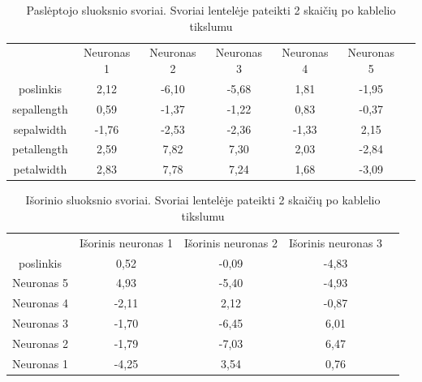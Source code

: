 \documentclass{VUMIFPSbakalaurinis}
\begin{document}
\begin{table}[]
  \centering
  \caption{Paslėptojo sluoksnio svoriai. Svoriai 
    lentelėje pateikti 2 skaičių po kablelio tikslumu}{
      \begin{tabular}{|c|c|c|c|c|c|c}
        \cline{1-6}
                    & Neuronas 1 & Neuronas 2 & Neuronas 3 & Neuronas 4 & Neuronas 5 &  \\ \cline{1-6}
        poslinkis   & 2,12       & -6,10      & -5,68      & 1,81       & -1,95      &  \\ \cline{1-6}
        sepallength & 0,59       & -1,37      & -1,22      & 0,83       & -0,37      &  \\ \cline{1-6}
        sepalwidth  & -1,76      & -2,53      & -2,36      & -1,33      & 2,15       &  \\ \cline{1-6}
        petallength & 2,59       & 7,82       & 7,30       & 2,03       & -2,84      &  \\ \cline{1-6}
        petalwidth  & 2,83       & 7,78       & 7,24       & 1,68       & -3,09      &  \\ \cline{1-6}
        \end{tabular}}
  \label{tab:svoriai-pasleptas}
\end{table}


\begin{table}[]
  \centering
  \caption{Išorinio sluoksnio svoriai. Svoriai 
    lentelėje pateikti 2 skaičių po kablelio tikslumu}{
      \begin{tabular}{|c|c|c|c|c}
        \cline{1-4}
                   & Išorinis neuronas 1 & Išorinis neuronas 2 & Išorinis neuronas 3 &  \\ \cline{1-4}
        poslinkis  & 0,52                & -0,09               & -4,83               &  \\ \cline{1-4}
        Neuronas 5 & 4,93                & -5,40               & -4,93               &  \\ \cline{1-4}
        Neuronas 4 & -2,11               & 2,12                & -0,87               &  \\ \cline{1-4}
        Neuronas 3 & -1,70               & -6,45               & 6,01                &  \\ \cline{1-4}
        Neuronas 2 & -1,79               & -7,03               & 6,47                &  \\ \cline{1-4}
        Neuronas 1 & -4,25               & 3,54                & 0,76                &  \\ \cline{1-4}
        \end{tabular}}
  \label{tab:svoriai-nepasleptas}
\end{table}
\end{document}
